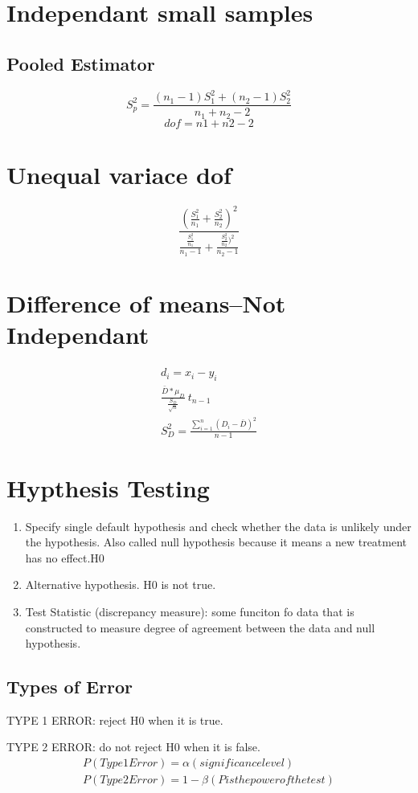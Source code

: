 \documentclass[11pt]{article}
\begin{document}
\section{Independant small samples}
\subsection{Pooled Estimator}
\begin{equation}
  S_p^2 = \frac{(n_1-1)S_1^2 + (n_2-1)S_2^2}{n_1+n_2-2}
\end{equation}
\begin{equation}
  dof = n1+n2-2
\end{equation}
\section{Unequal variace dof}
\begin{equation}
  \frac{(\frac{S_1^2}{n_1}+\frac{S_2^2}{n_2})^2}{\frac{\frac{S_1^2}{n_1}}{n_1-1}+\frac{\frac{S_2^2}{n_2})^2}{n_2-1}}
\end{equation}
\section{Difference of means--Not Independant}
\begin{align*}
  d_i= x_i - y_i \\
  \frac{\bar{D} * \mu_D}{\frac{S_D}{\sqrt{n}}}~t_{n-1} \\
  S_D^2=\frac{\sum_{i=1}^n (D_i-\bar{D})^2}{n-1}
\end{align*}
\section{Hypthesis Testing}
\begin{enumerate}
  \item Specify single default hypothesis and check whether the data is
    unlikely under the hypothesis. Also called null hypothesis because it means
    a new treatment has no effect.H0
  \item Alternative hypothesis. H0 is not true.
  \item Test Statistic (discrepancy measure): some funciton fo data that is
    constructed to measure degree of agreement between the data and null
    hypothesis.
\end{enumerate}
\subsection{Types of Error}
\par TYPE 1 ERROR: reject H0 when it is true.
\par TYPE 2 ERROR: do not reject H0 when it is false.
\begin{align*}
  P(Type 1 Error) = \alpha (significance level)\\
  P(Type 2 Error) = 1 - \beta (P is the power of the test)
\end{align*}
\end{document}

